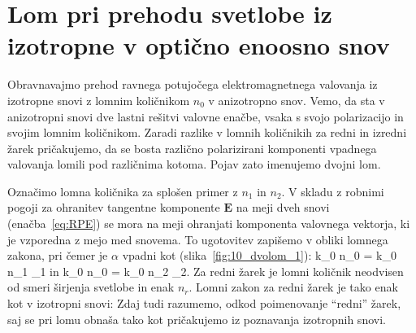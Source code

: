 \section{Lom pri prehodu svetlobe iz izotropne v optično enoosno snov}
Obravnavajmo prehod ravnega potujočega elektromagnetnega valovanja iz izotropne snovi 
z lomnim količnikom $n_0$ v anizotropno snov. Vemo, da sta v anizotropni snovi 
dve lastni rešitvi valovne enačbe, vsaka s svojo polarizacijo in svojim lomnim količnikom.
Zaradi razlike v lomnih količnikih za redni in izredni žarek pričakujemo,
da se bosta različno polarizirani komponenti vpadnega valovanja lomili 
pod različnima kotoma. Pojav zato imenujemo dvojni lom.

Označimo lomna količnika za splošen primer z $n_1$ in $n_2$.
V skladu z robnimi pogoji za ohranitev tangentne komponente $\mathbf{E}$ 
na meji dveh snovi (enačba~\ref{eq:RPE}) se mora na meji ohranjati 
komponenta valovnega vektorja, ki je vzporedna z mejo med snovema.
To ugotovitev zapišemo v obliki lomnega zakona, pri čemer je $\alpha$ vpadni kot 
(slika~\ref{fig:10_dvolom_1}):
\beq
k_0 n_0 \sin \alpha = k_0 n_1 \sin \beta_1 
\label{eq:10_106a}
\eeq
in 
\beq
k_0 n_0 \sin \alpha = k_0 n_2 \sin \beta_2.
\label{eq:10_106}
\eeq
Za redni žarek je lomni količnik neodvisen od smeri širjenja svetlobe in enak $n_r$.
Lomni zakon za redni žarek je tako enak kot v izotropni snovi:
Zdaj tudi razumemo, odkod poimenovanje ``redni'' žarek, saj se pri lomu obnaša tako kot
pričakujemo iz poznavanja izotropnih snovi. 

